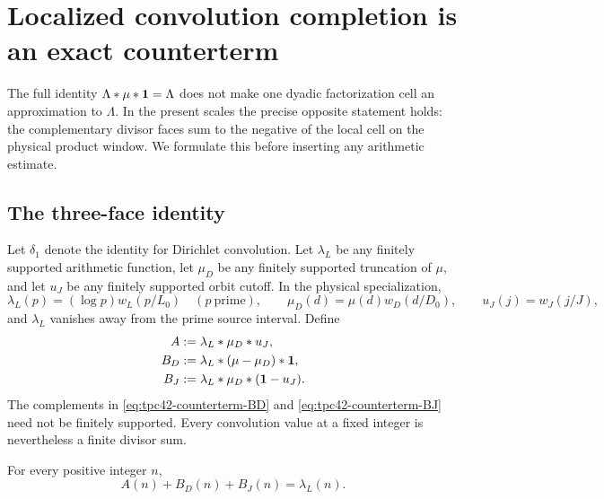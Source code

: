 \section{Localized convolution completion is an exact counterterm}
\label{sec:tpc42-convolution-counterterm}

The full identity
\(
 \Lambda*\mu*\mathbf 1=\Lambda
\)
does not make one dyadic factorization cell an approximation to
\(\Lambda\).  In the present scales the precise opposite statement holds:
the complementary divisor faces sum to the negative of the local cell on
the physical product window.  We formulate this before inserting any
arithmetic estimate.

\subsection{The three-face identity}

Let \(\delta_1\) denote the identity for Dirichlet convolution.  Let
\(\lambda_L\) be any finitely supported arithmetic function, let
\(\mu_D\) be any finitely supported truncation of \(\mu\), and let
\(u_J\) be any finitely supported orbit cutoff.  In the physical
specialization,
\begin{equation}
 \lambda_L(p)=(\log p)w_L(p/L_0)
 \quad(p\ \text{prime}),
 \qquad
 \mu_D(d)=\mu(d)w_D(d/D_0),
 \qquad
 u_J(j)=w_J(j/J),
 \label{eq:tpc42-counterterm-physical-functions}
\end{equation}
and \(\lambda_L\) vanishes away from the prime source interval.  Define
\begin{align}
 A&:=\lambda_L*\mu_D*u_J,
 \label{eq:tpc42-counterterm-A}\\
 B_D&:=\lambda_L*(\mu-\mu_D)*\mathbf 1,
 \label{eq:tpc42-counterterm-BD}\\
 B_J&:=\lambda_L*\mu_D*(\mathbf 1-u_J).
 \label{eq:tpc42-counterterm-BJ}
\end{align}
The complements in \eqref{eq:tpc42-counterterm-BD} and
\eqref{eq:tpc42-counterterm-BJ} need not be finitely supported.  Every
convolution value at a fixed integer is nevertheless a finite divisor
sum.

\begin{theorem}
\label{thm:tpc42-three-face-completion}
For every positive integer \(n\),
\begin{equation}
 \boxed{A(n)+B_D(n)+B_J(n)=\lambda_L(n).}
 \label{eq:tpc42-three-face-identity}
\end{equation}
\end{theorem}

